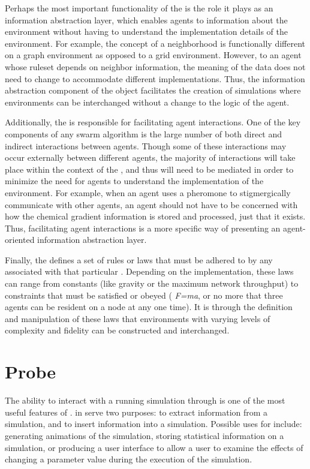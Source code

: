 Perhaps the most important functionality of the  is the role it plays as an information abstraction layer, which enables agents to  information about the environment without having to understand the implementation details of the environment. For example, the concept of a neighborhood is functionally different on a graph environment as opposed to a grid environment. However, to an agent whose ruleset depends on neighbor information, the meaning of the data does not need to change to accommodate different  implementations. Thus, the information abstraction component of the  object facilitates the creation of simulations where environments can be interchanged without a change to the logic of the agent.

Additionally,  the  is responsible for facilitating agent interactions. One of the key components of any swarm algorithm is the large number of both direct and indirect interactions between agents. Though some of these interactions may occur externally between different agents, the majority of interactions will take place within the context of the , and thus will need to be mediated in order to minimize the need for agents to understand the implementation of the environment. For example, when an agent uses a pheromone to stigmergically communicate with other agents, an agent should not have to be concerned with how the chemical gradient information is stored and processed, just that it exists. Thus, facilitating agent interactions is a more specific way of presenting an agent-oriented information abstraction layer.

Finally, the  defines a set of rules or laws that must be adhered to by any  associated with that particular . Depending on the  implementation, these laws can range from constants (like gravity or the maximum network throughput) to constraints that must be satisfied or obeyed (\eg{} \textit{F=ma}, or no more that three agents can be resident on a node at any one time). It is through the definition and manipulation of these laws that environments with varying levels of complexity and fidelity can be constructed and interchanged.

\section{Probe}
The ability to interact with a running simulation through  is one of the most useful features of \SWEEP{}.   in \SWEEP{} serve two purposes: to extract information from a simulation, and to insert information into a simulation. Possible uses for  include: generating animations of the simulation, storing statistical information on a simulation, or producing a user interface to allow a user to examine the effects of changing a parameter value during the execution of the simulation.

